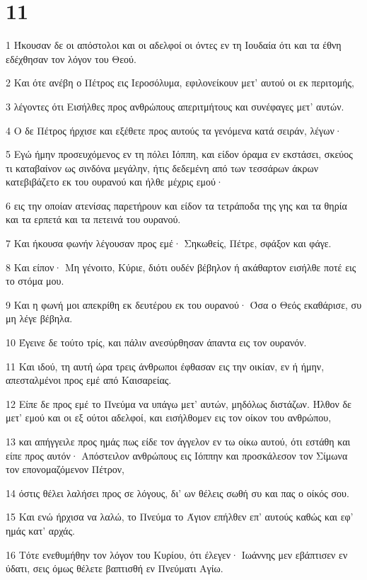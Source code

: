\chapter{11}

\par 1 Ήκουσαν δε οι απόστολοι και οι αδελφοί οι όντες εν τη Ιουδαία ότι και τα έθνη εδέχθησαν τον λόγον του Θεού.
\par 2 Και ότε ανέβη ο Πέτρος εις Ιεροσόλυμα, εφιλονείκουν μετ' αυτού οι εκ περιτομής,
\par 3 λέγοντες ότι Εισήλθες προς ανθρώπους απεριτμήτους και συνέφαγες μετ' αυτών.
\par 4 Ο δε Πέτρος ήρχισε και εξέθετε προς αυτούς τα γενόμενα κατά σειράν, λέγων·
\par 5 Εγώ ήμην προσευχόμενος εν τη πόλει Ιόππη, και είδον όραμα εν εκστάσει, σκεύος τι καταβαίνον ως σινδόνα μεγάλην, ήτις δεδεμένη από των τεσσάρων άκρων κατεβιβάζετο εκ του ουρανού και ήλθε μέχρις εμού·
\par 6 εις την οποίαν ατενίσας παρετήρουν και είδον τα τετράποδα της γης και τα θηρία και τα ερπετά και τα πετεινά του ουρανού.
\par 7 Και ήκουσα φωνήν λέγουσαν προς εμέ· Σηκωθείς, Πέτρε, σφάξον και φάγε.
\par 8 Και είπον· Μη γένοιτο, Κύριε, διότι ουδέν βέβηλον ή ακάθαρτον εισήλθε ποτέ εις το στόμα μου.
\par 9 Και η φωνή μοι απεκρίθη εκ δευτέρου εκ του ουρανού· Όσα ο Θεός εκαθάρισε, συ μη λέγε βέβηλα.
\par 10 Έγεινε δε τούτο τρίς, και πάλιν ανεσύρθησαν άπαντα εις τον ουρανόν.
\par 11 Και ιδού, τη αυτή ώρα τρεις άνθρωποι έφθασαν εις την οικίαν, εν ή ήμην, απεσταλμένοι προς εμέ από Καισαρείας.
\par 12 Είπε δε προς εμέ το Πνεύμα να υπάγω μετ' αυτών, μηδόλως διστάζων. Ήλθον δε μετ' εμού και οι εξ ούτοι αδελφοί, και εισήλθομεν εις τον οίκον του ανθρώπου,
\par 13 και απήγγειλε προς ημάς πως είδε τον άγγελον εν τω οίκω αυτού, ότι εστάθη και είπε προς αυτόν· Απόστειλον ανθρώπους εις Ιόππην και προσκάλεσον τον Σίμωνα τον επονομαζόμενον Πέτρον,
\par 14 όστις θέλει λαλήσει προς σε λόγους, δι' ων θέλεις σωθή συ και πας ο οίκός σου.
\par 15 Και ενώ ήρχισα να λαλώ, το Πνεύμα το Άγιον επήλθεν επ' αυτούς καθώς και εφ' ημάς κατ' αρχάς.
\par 16 Τότε ενεθυμήθην τον λόγον του Κυρίου, ότι έλεγεν· Ιωάννης μεν εβάπτισεν εν ύδατι, σεις όμως θέλετε βαπτισθή εν Πνεύματι Αγίω.
